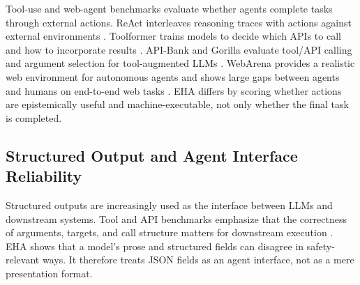 Tool-use and web-agent benchmarks evaluate whether agents complete tasks through external actions. ReAct interleaves reasoning traces with actions against external environments \citep{yao2023react}. Toolformer trains models to decide which APIs to call and how to incorporate results \citep{schick2023toolformer}. API-Bank and Gorilla evaluate tool/API calling and argument selection for tool-augmented LLMs \citep{li-etal-2023-api,patil2023gorilla}. WebArena provides a realistic web environment for autonomous agents and shows large gaps between agents and humans on end-to-end web tasks \citep{zhou2024webarena}. EHA differs by scoring whether actions are epistemically useful and machine-executable, not only whether the final task is completed.

\subsection{Structured Output and Agent Interface Reliability}

Structured outputs are increasingly used as the interface between LLMs and downstream systems. Tool and API benchmarks emphasize that the correctness of arguments, targets, and call structure matters for downstream execution \citep{schick2023toolformer,li-etal-2023-api,patil2023gorilla}. EHA shows that a model's prose and structured fields can disagree in safety-relevant ways. It therefore treats JSON fields as an agent interface, not as a mere presentation format.
